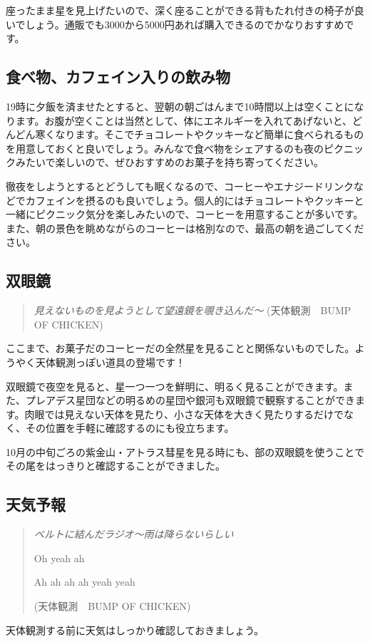 \documentclass[../../super_nova_2024]{subfiles}
\begin{document}
座ったまま星を見上げたいので、深く座ることができる背もたれ付きの椅子が良いでしょう。通販でも3000から5000円あれば購入できるのでかなりおすすめです。

\subsection{食べ物、カフェイン入りの飲み物}
19時に夕飯を済ませたとすると、翌朝の朝ごはんまで10時間以上は空くことになります。お腹が空くことは当然として、体にエネルギーを入れてあげないと、どんどん寒くなります。そこでチョコレートやクッキーなど簡単に食べられるものを用意しておくと良いでしょう。みんなで食べ物をシェアするのも夜のピクニックみたいで楽しいので、ぜひおすすめのお菓子を持ち寄ってください。

徹夜をしようとするとどうしても眠くなるので、コーヒーやエナジードリンクなどでカフェインを摂るのも良いでしょう。個人的にはチョコレートやクッキーと一緒にピクニック気分を楽しみたいので、コーヒーを用意することが多いです。また、朝の景色を眺めながらのコーヒーは格別なので、最高の朝を過ごしてください。

\subsection{双眼鏡}
\begin{verse}
  {\slshape
  見えないものを見ようとして望遠鏡を覗き込んだ〜
  }
  {\footnotesize(天体観測　BUMP OF CHICKEN)}
\end{verse}


ここまで、お菓子だのコーヒーだの全然星を見ることと関係ないものでした。ようやく天体観測っぽい道具の登場です！

双眼鏡で夜空を見ると、星一つ一つを鮮明に、明るく見ることができます。また、プレアデス星団などの明るめの星団や銀河も双眼鏡で観察することができます。肉眼では見えない天体を見たり、小さな天体を大きく見たりするだけでなく、その位置を手軽に確認するのにも役立ちます。

10月の中旬ごろの紫金山・アトラス彗星を見る時にも、部の双眼鏡を使うことでその尾をはっきりと確認することができました。

\subsection{天気予報}
\begin{verse}
  {\slshape
    ベルトに結んだラジオ〜雨は降らないらしい

    Oh yeah ah

    Ah ah ah ah yeah yeah

  }
  {\footnotesize(天体観測　BUMP OF CHICKEN)}
\end{verse}
天体観測する前に天気はしっかり確認しておきましょう。
\end{document}
